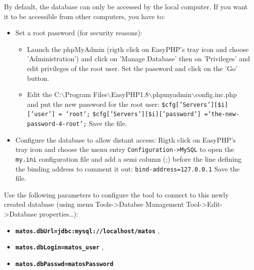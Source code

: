 {  By default, the database can only be accessed by the local computer.
  If you want it to be accessible from other computers, you have to:
  	\begin{itemize}
	    \item Set a root password (for security reasons):
		\begin{itemize}
			\item Launch the phpMyAdmin (rigth click on EasyPHP's tray icon and choose
			'Administration') and click on 'Manage Database' then on 'Privileges' and
			edit privileges of the root user. Set the password and click on the 'Go' 
			button.
			\item Edit the C:$\backslash$Program Files$\backslash$EasyPHP1.8$\backslash$phpmyadmin$\backslash$config.inc.php and
			put the new password for the root user:
			\newline \texttt{\$cfg['Servers'][\$i]['user'] = 'root';}
 			\newline \texttt{\$cfg['Servers'][\$i]['password'] ='the-new-password-4-root';} 
 			\newline Save the file.
	    \end{itemize}
	    \item Configure the database to allow distant access:
	    Rigth click on EasyPHP's tray icon and choose the menu entry
	    \texttt{Configuration->MySQL} to open the \texttt{my.ini} configuration
	    file and add a semi column (;) before the line defining the binding address
	    to comment it out:\newline
	    \texttt{bind-address=127.0.0.1} 
	    \newline Save the file.
	\end{itemize}

Use the following parameters to configure the \ma tool to connect to this
newly created database (using menu Tools->Databse Management
Tool->Edit->Database properties\ldots):
  	\begin{itemize}
        \item \texttt{\textbf{matos.dbUrl=jdbc:mysql://localhost/matos}} ,
        \item \texttt{\textbf{matos.dbLogin=matos\_user}} ,
	    \item \texttt{\textbf{matos.dbPasswd=matosPassword}} 
    \end{itemize}

}{}
